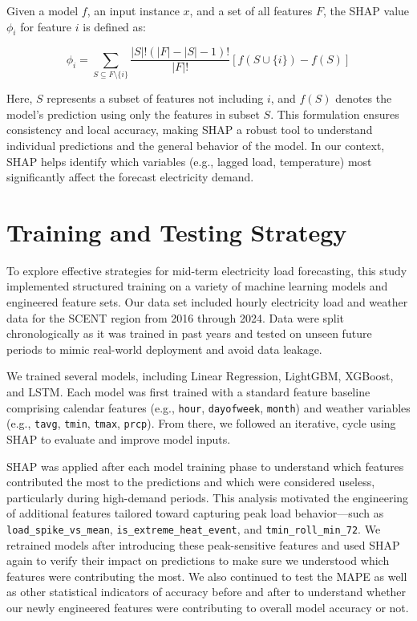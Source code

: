 \documentclass{ifacconf}
\begin{document}
\begin{itemize}
Given a model \( f \), an input instance \( x \), and a set of all features \( F \), the SHAP value \( \phi_i \) for feature \( i \) is defined as:

\begin{equation}
\phi_i = \sum_{S \subseteq F \setminus \{i\}} \frac{|S|! (|F| - |S| - 1)!}{|F|!} \left[ f(S \cup \{i\}) - f(S) \right]
\end{equation}

Here, \( S \) represents a subset of features not including \( i \), and \( f(S) \) denotes the model's prediction using only the features in subset \( S \). This formulation ensures consistency and local accuracy, making SHAP a robust tool to understand individual predictions and the general behavior of the model. In our context, SHAP helps identify which variables (e.g., lagged load, temperature) most significantly affect the forecast electricity demand.
\end{itemize}

\section{Training and Testing Strategy}

To explore effective strategies for mid-term electricity load forecasting, this study implemented structured training on a variety of machine learning models and engineered feature sets. Our data set included hourly electricity load and weather data for the SCENT region from 2016 through 2024. Data were split chronologically as it was trained in past years and tested on unseen future periods to mimic real-world deployment and avoid data leakage.

We trained several models, including Linear Regression, LightGBM, XGBoost, and LSTM. Each model was first trained with a standard feature baseline comprising calendar features (e.g., \texttt{hour}, \texttt{dayofweek}, \texttt{month}) and weather variables (e.g., \texttt{tavg}, \texttt{tmin}, \texttt{tmax}, \texttt{prcp}). From there, we followed an iterative,  cycle using SHAP to evaluate and improve model inputs.

SHAP was applied after each model training phase to understand which features contributed the most to the predictions and which were considered useless, particularly during high-demand periods. This analysis motivated the engineering of additional features tailored toward capturing peak load behavior—such as \texttt{load\_spike\_vs\_mean}, \texttt{is\_extreme\_heat\_event}, and \texttt{tmin\_roll\_min\_72}. We retrained models after introducing these peak-sensitive features and used SHAP again to verify their impact on predictions to make sure we understood which features were contributing the most. We also continued to test the MAPE as well as other statistical indicators of accuracy before and after to understand whether our newly engineered features were contributing to overall model accuracy or not.
\end{document}
